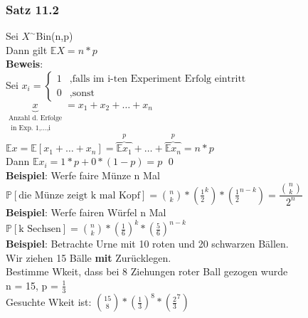 \subsubsection{Satz 11.2}
Sei $X^\sim$Bin(n,p)\\
Dann gilt $\mathds{E}X=n*p$\medskip\\
\textbf{Beweis}:\\Sei 
$x_i = \begin{cases}
1&,\text{falls im i-ten Experiment Erfolg eintritt}\\
0&,\text{sonst}
\end{cases}$\smallskip\\
$\underbrace{x}_{\substack{\text{Anzahl d. Erfolge}\\\text{ in Exp. 1,...,i}}} = x_1 + x_2 + \dots + x_n$\smallskip\\
$\mathds{E}x = \mathds{E}[x_1+\dots+x_n]=\overbrace{\mathds{E}x_1}^p+\dots + \overbrace{\mathds{E}x_n}^p = n*p$\smallskip\\
Dann $\mathds{E}x_i = 1*p + 0*(1-p)=p$ \qed\medskip\\
\textbf{Beispiel}: Werfe faire Münze n Mal\\
$\mathds{P}[\text{die Münze zeigt k mal Kopf}]=\binom{n}{k}*(\frac{1}{2}^k)*(\frac{1}{2}^{n-k}) = \dfrac{\binom{n}{k}}{2^n}$\smallskip\\
\textbf{Beispiel}: Werfe fairen Würfel n Mal\\
$\mathds{P}[\text{k Sechsen}]=\binom{n}{k}*(\frac{1}{6})^k*(\frac{5}{6})^{n-k}$\smallskip\\
\textbf{Beispiel}: Betrachte Urne mit 10 roten und 20 schwarzen Bällen. \\Wir ziehen 15 Bälle \textbf{mit} Zurücklegen.\\
Bestimme Wkeit, dass bei 8 Ziehungen roter Ball gezogen wurde\smallskip\\
n = 15, p = $\frac{1}{3}$\\
Gesuchte Wkeit ist: $\binom{15}{8}*(\frac{1}{3})^8*(\frac{2}{3}^7)$